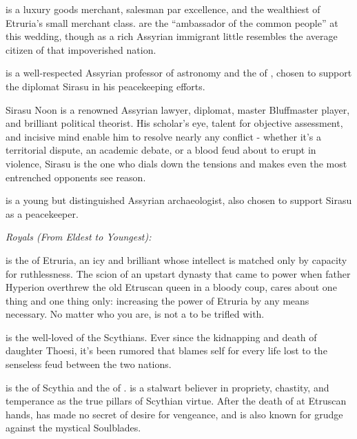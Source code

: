 \documentclass[blue]{Kos}
\begin{document}
{\cMerchant{} is a luxury goods merchant, salesman par excellence, and the wealthiest of Etruria's small merchant class. \cMerchant{\They} are the ``ambassador of the common people'' at this wedding, though as a rich Assyrian immigrant \cMerchant{\they} little resembles the average citizen of that impoverished nation. 

\cAnarchist{} is a well-respected Assyrian professor of astronomy and the \cAnarchist{\sibling} of \cMerchant{}, chosen to support the diplomat Sirasu in his peacekeeping efforts.

Sirasu Noon is a renowned Assyrian lawyer, diplomat, master Bluffmaster player, and brilliant political theorist. His scholar's eye, talent for objective assessment, and incisive mind enable him to resolve nearly any conflict - whether it’s a territorial dispute, an academic debate, or a blood feud about to erupt in violence, Sirasu is the one who dials down the tensions and makes even the most entrenched opponents see reason.

\cArchaeologist{} is a young but distinguished Assyrian archaeologist, also chosen to support Sirasu as a peacekeeper.

\emph{Royals (From Eldest to Youngest):}

\cEtruriaKing{} is the \cEtruriaKing{\monarch} of Etruria, an icy and brilliant \cEtruriaKing{\human} whose intellect is matched only by \cEtruriaKing{\their} capacity for ruthlessness. The scion of an upstart dynasty that came to power when \cEtruriaKing{\their} father Hyperion overthrew the old Etruscan queen in a bloody coup, \cEtruriaKing{\they} cares about one thing and one thing only: increasing the power of Etruria by any means necessary. No matter who you are, \cEtruriaKing{\they} is not a \cEtruriaKing{\human} to be trifled with.

\cScythiaKing{} is the well-loved \cScythiaKing{\monarch} of the Scythians. Ever since the kidnapping and death of \cScythiaKing{\their} daughter Thoesi, it’s been rumored that \cScythiaKing{\they} blames \cScythiaKing{\them}self for every life lost to the senseless feud between the two nations.

\cScythiaQueen{} is the \cScythiaQueen{\monarch} of Scythia and the \cScythiaQueen{\spouse} of \cScythiaKing{}. \cScythiaQueen{\They} is a stalwart believer in propriety, chastity, and temperance as the true pillars of Scythian virtue. After the death of \cScythiaQueen{\their} \cFugitive{\offspring} at Etruscan hands, \cScythiaQueen{} has made no secret of \cScythiaQueen{\their} desire for vengeance, and is also known for \cScythiaQueen{\their} grudge against the mystical Soulblades.

}
\end{document}
